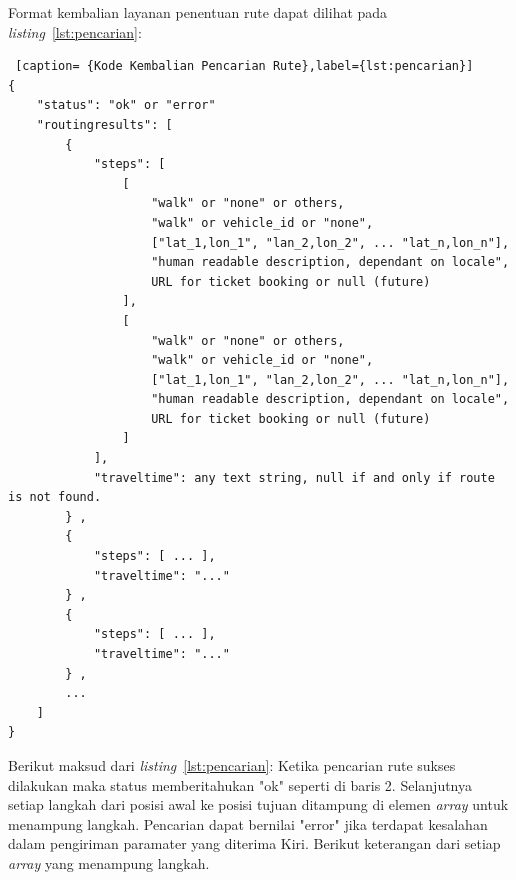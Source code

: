 Format kembalian layanan penentuan rute dapat dilihat pada \textit{listing}~\ref{lst:pencarian}:

\begin{lstlisting} [caption= {Kode Kembalian Pencarian Rute},label={lst:pencarian}]
{ 
    "status": "ok" or "error" 
    "routingresults": [ 
        {
            "steps": [
                [
                    "walk" or "none" or others,
                    "walk" or vehicle_id or "none",
                    ["lat_1,lon_1", "lan_2,lon_2", ... "lat_n,lon_n"],
                    "human readable description, dependant on locale",
                    URL for ticket booking or null (future)
                ],
                [
                    "walk" or "none" or others,
                    "walk" or vehicle_id or "none",
                    ["lat_1,lon_1", "lan_2,lon_2", ... "lat_n,lon_n"],
                    "human readable description, dependant on locale",
                    URL for ticket booking or null (future)
                ]
            ],
            "traveltime": any text string, null if and only if route is not found.
        } ,
        {
            "steps": [ ... ],
            "traveltime": "..."
        } ,
        {
            "steps": [ ... ],
            "traveltime": "..."
        } ,
        ...     
    ]
}
\end{lstlisting}
Berikut maksud dari \textit{listing}~\ref{lst:pencarian}: \newline
\hspace{0.5cm} Ketika pencarian rute sukses dilakukan maka status memberitahukan "ok" seperti di baris 2. Selanjutnya setiap langkah dari posisi awal ke posisi tujuan ditampung di elemen \textit{array} untuk menampung langkah. Pencarian dapat bernilai "error" jika terdapat kesalahan dalam pengiriman paramater yang diterima Kiri. Berikut keterangan dari setiap \textit{array} yang menampung langkah. 

